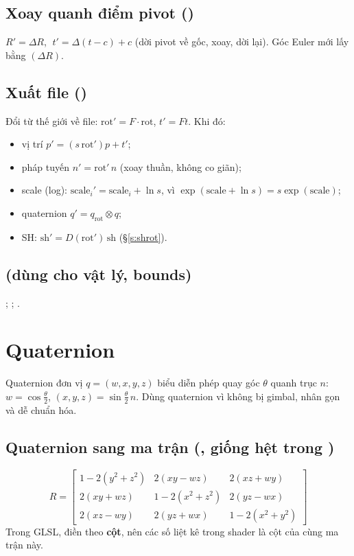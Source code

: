 \subsection{Xoay quanh điểm pivot ()}
$R'=\Delta R$, $\;t'=\Delta(t-c)+c$ (dời pivot về gốc, xoay, dời lại). Góc Euler mới lấy bằng $(\Delta R)$.

\subsection{Xuất file ()}
Đổi từ thế giới về file: $\mathrm{rot}'=F\cdot\mathrm{rot}$, $t'=F t$. Khi đó:
\begin{itemize}
\item vị trí $p'=(s\,\mathrm{rot}')p+t'$;
\item pháp tuyến $n'=\mathrm{rot}'\,n$ (xoay thuần, không co giãn);
\item scale (log): $\mathrm{scale}_i'=\mathrm{scale}_i+\ln s$, vì $\exp(\mathrm{scale}+\ln s)=s\exp(\mathrm{scale})$;
\item quaternion $q'=q_{\mathrm{rot}}\otimes q$;
\item SH: $\mathrm{sh}'=D(\mathrm{rot}')\,\mathrm{sh}$ (\S\ref{s:shrot}).
\end{itemize}

\subsection{ (dùng cho vật lý, bounds)}
; ; .

\section{Quaternion}\label{s:quat}
Quaternion đơn vị $q=(w,x,y,z)$ biểu diễn phép quay góc $\theta$ quanh trục $n$: $w=\cos\frac\theta2$, $(x,y,z)=\sin\frac\theta2\,n$. Dùng quaternion vì không bị gimbal, nhân gọn và dễ chuẩn hóa.

\subsection{Quaternion sang ma trận (, giống hệt trong )}
\[
R=\begin{bmatrix}
1-2(y^2+z^2) & 2(xy-wz) & 2(xz+wy)\\
2(xy+wz) & 1-2(x^2+z^2) & 2(yz-wx)\\
2(xz-wy) & 2(yz+wx) & 1-2(x^2+y^2)
\end{bmatrix}
\]
Trong GLSL,  điền theo \textbf{cột}, nên các số liệt kê trong shader là cột của cùng ma trận này.

